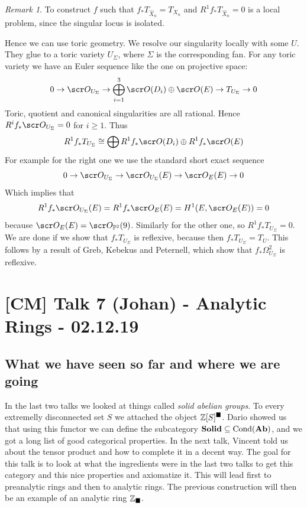 \documentclass[A4paper, british, reqno]{amsart}
\theoremstyle{darkgreentheorem}
\theoremstyle{darkbluedefinition}
\theoremstyle{darkredexample}
\theoremstyle{remark}
\newtheorem{rem}[thm]{Remark}
\DeclareMathOperator{\Cond}{Cond}
\newcommand{\Solid}{\mathbf{Solid}}
\newcommand{\1}{\mathbbm{1}}
\newcommand{\op}{\oplus}
\newcommand{\sub}{\subseteq}
\newcommand{\solid}{^{\blacksquare}}
\newcommand{\usolid}{_{\blacksquare}}
\begin{document}
\begin{rem}
    To construct $f$ such that $f_{*}T_{\hat{X}_{n}}=T_{X_{n}}$ and $R^{1}f_{*}T_{\hat{X}_{n}}=0$ is a local problem, since the singular locus is isolated.
\end{rem}

Hence we can use toric geometry.
We resolve our singularity locally with some $U$.
They glue to a toric variety $U_{\Sigma}$, where $\Sigma $ is the corresponding fan.
For any toric variety we have an Euler sequence like the one on projective space:
\[ 0\to \O_{U_{\Sigma}}\to \bigoplus_{i=1}^{3}\O(D_{i})\op \O(E)\to T_{U_{\Sigma}}\to 0 \]
Toric, quotient and canonical singularities are all rational.
Hence $R^{i}f_{*}\O_{U_{\Sigma}}=0$ for $i\geqslant 1$.
Thus
\[ R^{1}f_{*}T_{U_{\Sigma}}\cong \bigoplus R^{1}f_{*}\O(D_{i})\op R^{1}f_{*}\O(E) \]
For example for the right one we use the standard short exact sequence
\[ 0\to \O_{U_{\Sigma}}\to \O_{U_{\Sigma}}(E)\to \O_{E}(E)\to 0 \]
Which implies that
\[ R^{1}f_{*}\O_{U_{\Sigma}}(E)=R^{1}f_{*}\O_{E}(E)=H^{1}(E,\O_{E}(E))=0 \]
because $\O_{E}(E)=\O_{\P^{2}}(9)$.
Similarly for the other one, so $R^{1}f_{*}T_{U_{\Sigma}}=0$.
We are done if we show that $f_{*}T_{U_{\Sigma}}$ is reflexive, because then $f_{*}T_{U_{\Sigma}}=T_{U}$.
This follows by a result of Greb, Kebekus and Peternell, which show that $f_{*}\Omega_{U_{\Sigma}}^{2}$ is reflexive.

\section{[CM] Talk 7 (Johan) - Analytic Rings - 02.12.19}

\subsection{What we have seen so far and where we are going}

In the last two talks we looked at things called \textit{solid abelian groups}.
To every extremelly disconnected set $S$ we attached the object $\Z[S]\solid$.
Dario showed us that using this functor we can define the subcategory $\Solid\sub \Cond(\Ab)$, and we got a long list of good categorical properties.
In the next talk, Vincent told us about the tensor product and how to complete it in a decent way.
The goal for this talk is to look at what the ingredients were in the last two talks to get this category and this nice properties and axiomatize it.
This will lead first to preanalytic rings and then to analytic rings.
The previous construction will then be an example of an analytic ring $\Z\usolid$.
\end{document}
